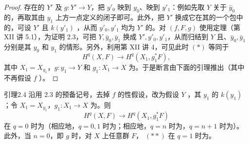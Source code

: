 \begin{proof}
存在的 $Y'$ 及 $g:Y'\to Y$，把 $y'_0$ 映到 $y_0$、映到 $y'_1$：例如先取 $Y$ 关于 $\bar y_0$ 的，再取其由 $y_1$ 上方一点定义的闭子即可。此外，把 $Y'$ 换成它在其的一个包中的，可设 $Y'$ 且 $k(y'_1)$ ，从而 $y'_0,y'_1$ 均为 $Y'$ 的。对 $(f,F,g)$ 使用定理（第 XII 讲 5.1），为证明 2.3，可把 $Y,\bar y_0,\bar y_1$ 换成 $Y',y'_0,y'_1$，从而归结到 $Y$ 且、$\bar y_0,\bar y_1$ 分别是其 $y_0$ 和 $y_1$ 的情形。另外，利用第 XII 讲 4，可见此时 $(*)$ 等同于
\[
H^q(X,F)\longrightarrow H^q(X_1,g_1^*F),
\]
其中 $X_1=X_{y_1}$，$g:y_1\to Y$ 和 $g_1:X_1\to X$ 为。于是断言由下面的引理推出（其中不再假设 $f$ ）。
\end{proof}
\begin{SGAresult}{引理}{2.4}
沿用 2.3 的预备记号，去掉 $f$ 的性假设，改为假设 $Y$ ，其 $y_1$ 的 $k(y_1)$ ；令 $X_1=X_{y_1}$，$g_1:X_1\to X$ 为。则
\[
H^q(X,F)\longrightarrow H^q(X_1,g_1^*F)\tag{**}
\]
在 $q=0$ 时为（相应地，$q=0,1$ 时为；相应地，$q=n$ 时为，$q=n+1$ 时为）。此外，当 $n=0$，即 $g$ 时，对 $X$ 上任意群 $F$， $(**)$ 在 $q=1$ 时为。
\end{SGAresult}
